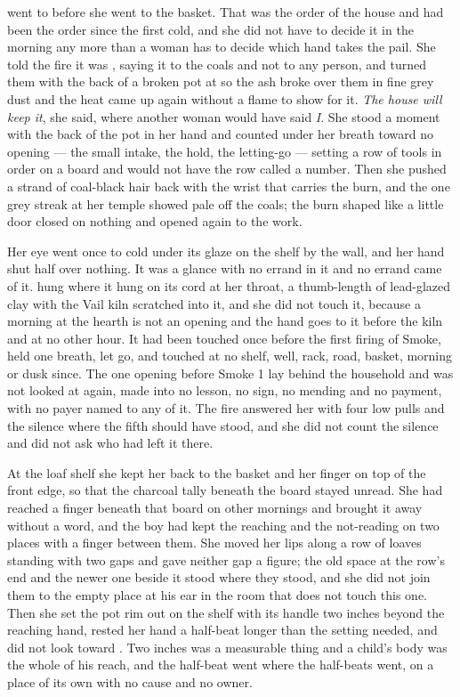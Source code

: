 \scenebreak

 went to  before she went to the basket. That was the order of the house and had been the order since the first cold, and she did not have to decide it in the morning any more than a woman has to decide which hand takes the pail. She told the fire it was , saying it to the coals and not to any person, and turned them with the back of a broken pot at  so the ash broke over them in fine grey dust and the heat came up again without a flame to show for it. \emph{The house will keep it}, she said, where another woman would have said \emph{I}. She stood a moment with the back of the pot in her hand and counted under her breath toward no opening --- the small intake, the hold, the letting-go --- setting a row of tools in order on a board and would not have the row called a number. Then she pushed a strand of coal-black hair back with the wrist that carries the burn, and the one grey streak at her temple showed pale off the coals; the burn shaped like a little door closed on nothing and opened again to the work.

Her eye went once to  cold under its glaze on the shelf by the wall, and her hand shut half over nothing. It was a glance with no errand in it and no errand came of it.  hung where it hung on its cord at her throat, a thumb-length of lead-glazed clay with the Vail kiln scratched into it, and she did not touch it, because a morning at the hearth is not an opening and the hand goes to it before the kiln and at no other hour. It had been touched once before the first firing of Smoke, held one breath, let go, and touched at no shelf, well, rack, road, basket, morning or dusk since. The one opening before Smoke 1 lay behind the household and was not looked at again, made into no lesson, no sign, no mending and no payment, with no payer named to any of it. The fire answered her with four low pulls and the silence where the fifth should have stood, and she did not count the silence and did not ask who had left it there.

At the loaf shelf she kept her back to the basket and her finger on top of the front edge, so that the charcoal tally beneath the board stayed unread. She had reached a finger beneath that board on other mornings and brought it away without a word, and the boy had kept the reaching and the not-reading on two places with a finger between them. She moved her lips along a row of loaves standing with two gaps and gave neither gap a figure; the old space at the row's end and the newer one beside it stood where they stood, and she did not join them to the empty place at his ear in the room that does not touch this one. Then she set the pot rim out on the shelf with its handle two inches beyond the reaching hand, rested her hand a half-beat longer than the setting needed, and did not look toward . Two inches was a measurable thing and a child's body was the whole of his reach, and the half-beat went where the half-beats went, on a place of its own with no cause and no owner.

